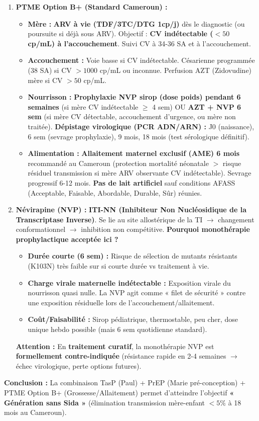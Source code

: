 \documentclass[11pt]{article}
\begin{document}
\begin{exoresolu}
\begin{enumerate}
    \item \textbf{PTME Option B+ (Standard Cameroun) :}
    \begin{itemize}
        \item \textbf{Mère :} \textbf{ARV à vie (TDF/3TC/DTG 1cp/j)} d\`es le diagnostic (ou poursuite si déjà sous ARV). Objectif : \textbf{CV indétectable ($< 50$ cp/mL) à l'accouchement}. Suivi CV à 34-36 SA et à l'accouchement.
        \item \textbf{Accouchement :} Voie basse si CV indétectable. Césarienne programmée (38 SA) si CV $> 1000$ cp/mL ou inconnue. Perfusion AZT (Zidovudine) mère si CV $> 50$ cp/mL.
        \item \textbf{Nourrisson :} \textbf{Prophylaxie NVP sirop (dose poids) pendant 6 semaines} (si mère CV indétectable $\ge$ 4 sem) OU \textbf{AZT + NVP 6 sem} (si mère CV détectable, accouchement d'urgence, ou mère non traitée). \textbf{Dépistage virologique (PCR ADN/ARN) :} J0 (naissance), 6 sem (sevrage prophylaxie), 9 mois, 18 mois (test sérologique définitif).
        \item \textbf{Alimentation :} \textbf{Allaitement maternel exclusif (AME) 6 mois} recommandé au Cameroun (protection mortalité néonatale $>$ risque résiduel transmission si mère ARV observante CV indétectable). Sevrage progressif 6-12 mois. \textbf{Pas de lait artificiel} sauf conditions AFASS (Acceptable, Faisable, Abordable, Durable, Sûr) réunies.
    \end{itemize}
    \item \textbf{Névirapine (NVP) :} \textbf{ITI-NN (Inhibiteur Non Nucléosidique de la Transcriptase Inverse)}. Se lie au site allostérique de la TI $\rightarrow$ changement conformationnel $\rightarrow$ inhibition non compétitive.
    \textbf{Pourquoi monothérapie prophylactique acceptée ici ?}
    \begin{itemize}
        \item \textbf{Durée courte (6 sem) :} Risque de sélection de mutants résistants (K103N) très faible sur si courte durée vs traitement à vie.
        \item \textbf{Charge virale maternelle indétectable :} Exposition virale du nourrisson quasi nulle. La NVP agit comme « filet de sécurité » contre une exposition résiduelle lors de l'accouchement/allaitement.
        \item \textbf{Coût/Faisabilité :} Sirop pédiatrique, thermostable, peu cher, dose unique hebdo possible (mais 6 sem quotidienne standard).
    \end{itemize}
    \textbf{Attention :} En \textbf{traitement curatif}, la monothérapie NVP est \textbf{formellement contre-indiquée} (résistance rapide en 2-4 semaines $\rightarrow$ échec virologique, perte options futures).
\end{enumerate}
\textbf{Conclusion :} La combinaison TasP (Paul) + PrEP (Marie pré-conception) + PTME Option B+ (Grossesse/Allaitement) permet d'atteindre l'objectif \textbf{« Génération sans Sida »} (élimination transmission mère-enfant $< 5\%$ à 18 mois au Cameroun).
\end{exoresolu}
\end{document}

